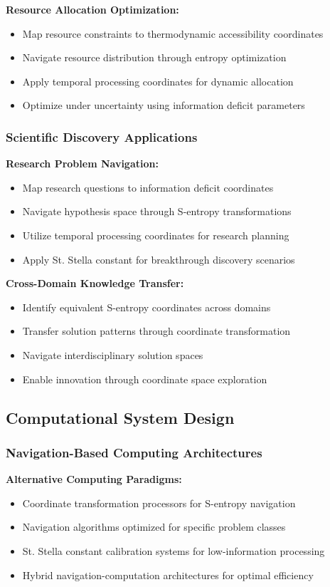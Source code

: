 \documentclass[11pt]{article}
\begin{document}
\textbf{Resource Allocation Optimization:}
\begin{itemize}
\item Map resource constraints to thermodynamic accessibility coordinates
\item Navigate resource distribution through entropy optimization
\item Apply temporal processing coordinates for dynamic allocation
\item Optimize under uncertainty using information deficit parameters
\end{itemize}

\subsubsection{Scientific Discovery Applications}

\textbf{Research Problem Navigation:}
\begin{itemize}
\item Map research questions to information deficit coordinates
\item Navigate hypothesis space through S-entropy transformations
\item Utilize temporal processing coordinates for research planning
\item Apply St. Stella constant for breakthrough discovery scenarios
\end{itemize}

\textbf{Cross-Domain Knowledge Transfer:}
\begin{itemize}
\item Identify equivalent S-entropy coordinates across domains
\item Transfer solution patterns through coordinate transformation
\item Navigate interdisciplinary solution spaces
\item Enable innovation through coordinate space exploration
\end{itemize}

\subsection{Computational System Design}

\subsubsection{Navigation-Based Computing Architectures}

\textbf{Alternative Computing Paradigms:}
\begin{itemize}
\item Coordinate transformation processors for S-entropy navigation
\item Navigation algorithms optimized for specific problem classes
\item St. Stella constant calibration systems for low-information processing
\item Hybrid navigation-computation architectures for optimal efficiency
\end{itemize}
\end{document}
